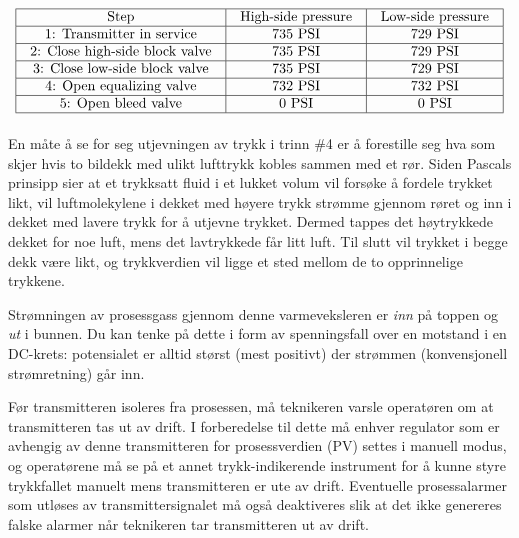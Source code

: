 
$$\vbox{\offinterlineskip
\halign{\strut
\vrule \quad\hfil # \ \hfil & 
\vrule \quad\hfil # \ \hfil & 
\vrule \quad\hfil # \ \hfil \vrule \cr
\noalign{\hrule}
%
Step & High-side pressure & Low-side pressure \cr
%
\noalign{\hrule}
%
1: Transmitter in service & 735 PSI & 729 PSI \cr
%
\noalign{\hrule}
%
2: Close high-side block valve & 735 PSI & 729 PSI \cr
%
\noalign{\hrule}
%
3: Close low-side block valve & 735 PSI & 729 PSI \cr
%
\noalign{\hrule}
%
4: Open equalizing valve & 732 PSI & 732 PSI \cr
%
\noalign{\hrule}
%
5: Open bleed valve & 0 PSI & 0 PSI \cr
%
\noalign{\hrule}
} %
}$$ %

En måte å se for seg utjevningen av trykk i trinn \#4 er å forestille seg hva som skjer hvis to bildekk med ulikt lufttrykk kobles sammen med et rør.  Siden Pascals prinsipp sier at et trykksatt fluid i et lukket volum vil forsøke å fordele trykket likt, vil luftmolekylene i dekket med høyere trykk strømme gjennom røret og inn i dekket med lavere trykk for å utjevne trykket.  Dermed tappes det høytrykkede dekket for noe luft, mens det lavtrykkede får litt luft.  Til slutt vil trykket i begge dekk være likt, og trykkverdien vil ligge et sted mellom de to opprinnelige trykkene.

\vskip 10pt

Strømningen av prosessgass gjennom denne varmeveksleren er {\it inn} på toppen og {\it ut} i bunnen.  Du kan tenke på dette i form av spenningsfall over en motstand i en DC-krets: potensialet er alltid størst (mest positivt) der strømmen (konvensjonell strømretning) går inn.

\vskip 10pt

Før transmitteren isoleres fra prosessen, må teknikeren varsle operatøren om at transmitteren tas ut av drift.  I forberedelse til dette må enhver regulator som er avhengig av denne transmitteren for prosessverdien (PV) settes i manuell modus, og operatørene må se på et annet trykk-indikerende instrument for å kunne styre trykkfallet manuelt mens transmitteren er ute av drift.  Eventuelle prosessalarmer som utløses av transmittersignalet må også deaktiveres slik at det ikke genereres falske alarmer når teknikeren tar transmitteren ut av drift.


